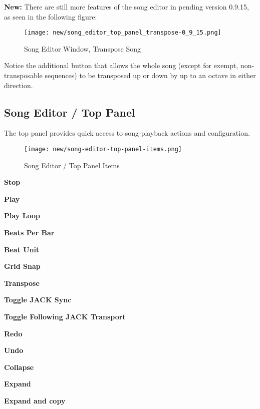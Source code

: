    \textbf{New:}
   There are still more features of the song editor in
   pending version 0.9.15, as seen in the following
   figure:

\begin{figure}[H]
   \centering 
   \texttt{[image: new/song\_editor\_top\_panel\_transpose-0\_9\_15.png]}
   \caption{Song Editor Window, Transpose Song}
   \label{fig:song_editor_window_transpose_song}
\end{figure}

   Notice the additional button that allows the whole song (except for
   exempt, non-transposable sequences) to be transposed up or down by up to an
   octave in either direction.

\subsection{Song Editor / Top Panel}
\label{subsec:seq64_song_editor_top}

   The top panel provides quick access to song-playback actions and
   configuration.

\begin{figure}[H]
   \centering 
   \texttt{[image: new/song-editor-top-panel-items.png]}
   \caption{Song Editor / Top Panel Items}
   \label{fig:song_editor_top_panel_items}
\end{figure}

   \begin{enumber}
      \item \textbf{Stop}
      \item \textbf{Play}
      \item \textbf{Play Loop}
      \item \textbf{Beats Per Bar}
      \item \textbf{Beat Unit}
      \item \textbf{Grid Snap}
      \item \textbf{Transpose}
      \item \textbf{Toggle JACK Sync}
      \item \textbf{Toggle Following JACK Transport}
      \item \textbf{Redo}
      \item \textbf{Undo}
      \item \textbf{Collapse}
      \item \textbf{Expand}
      \item \textbf{Expand and copy}
   \end{enumber}

